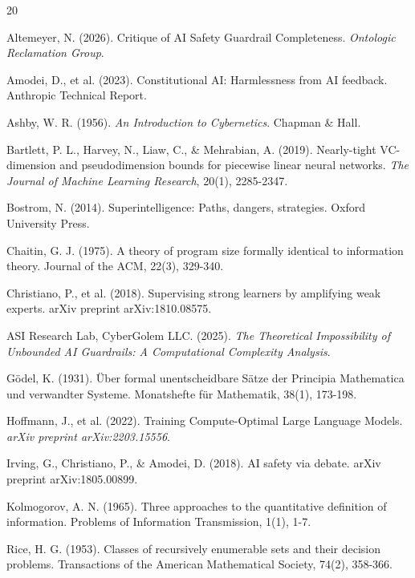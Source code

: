 \documentclass[11pt,twoside,letterpaper]{article}
\begin{document}
\begin{thebibliography}{20}

Altemeyer, N. (2026). Critique of AI Safety Guardrail Completeness. \textit{Ontologic Reclamation Group}.

Amodei, D., et al. (2023). Constitutional AI: Harmlessness from AI feedback. Anthropic Technical Report.

Ashby, W. R. (1956). \textit{An Introduction to Cybernetics}. Chapman \& Hall.

Bartlett, P. L., Harvey, N., Liaw, C., \& Mehrabian, A. (2019). Nearly-tight VC-dimension and pseudodimension bounds for piecewise linear neural networks. \textit{The Journal of Machine Learning Research}, 20(1), 2285-2347.

Bostrom, N. (2014). Superintelligence: Paths, dangers, strategies. Oxford University Press.

Chaitin, G. J. (1975). A theory of program size formally identical to information theory. Journal of the ACM, 22(3), 329-340.

Christiano, P., et al. (2018). Supervising strong learners by amplifying weak experts. arXiv preprint arXiv:1810.08575.

ASI Research Lab, CyberGolem LLC. (2025). \textit{The Theoretical Impossibility of Unbounded AI Guardrails: A Computational Complexity Analysis}.

Gödel, K. (1931). Über formal unentscheidbare Sätze der Principia Mathematica und verwandter Systeme. Monatshefte für Mathematik, 38(1), 173-198.

Hoffmann, J., et al. (2022). Training Compute-Optimal Large Language Models. \textit{arXiv preprint arXiv:2203.15556}.

Irving, G., Christiano, P., \& Amodei, D. (2018). AI safety via debate. arXiv preprint arXiv:1805.00899.

Kolmogorov, A. N. (1965). Three approaches to the quantitative definition of information. Problems of Information Transmission, 1(1), 1-7.

Rice, H. G. (1953). Classes of recursively enumerable sets and their decision problems. Transactions of the American Mathematical Society, 74(2), 358-366.


\end{thebibliography}
\end{document}
